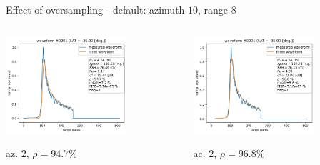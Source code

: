 \documentclass[compress,8pt]{beamer}
\begin{document}
\begin{frame}{Effect of oversampling \textnormal{- default: azimuth $10$, range $8$}}
\begin{columns}
\begin{column}{0.45\textwidth}
  \includegraphics[width=0.7\textwidth]{fig/wfm_1_num_PTRnum_OSAL2}

  az. $2$, $\rho=94.7\%$ 

  
\end{column}
\begin{column}{0.45\textwidth}\centering

\includegraphics[width=0.7\textwidth]{fig/wfm_1_num_PTRnum_OSAC2} 

ac. $2$, $\rho=96.8\%$ 
  
\end{column}
\end{columns}

\end{frame}
\end{document}
